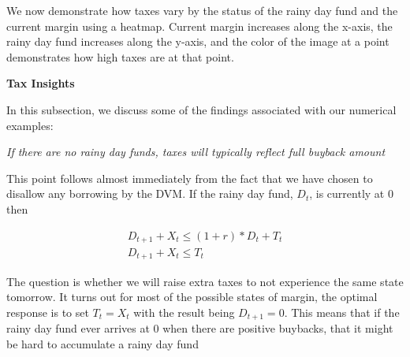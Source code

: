 \begin{center}
  \begin{figure}[H]
    \label{fig:sm_stochastic_buybacks}
  \end{figure}
\end{center}

We now demonstrate how taxes vary by the status of the rainy day fund and the current margin using
a heatmap. Current margin increases along the x-axis, the rainy day fund increases along the y-axis,
and the color of the image at a point demonstrates how high taxes are at that point.


\textbf{Tax Insights}

In this subsection, we discuss some of the findings associated with our numerical examples:

\textit{If there are no rainy day funds, taxes will typically reflect full buyback amount}

This point follows almost immediately from the fact that we have chosen to disallow any borrowing by
the DVM. If the rainy day fund, $D_t$, is currently at 0 then

\begin{align*}
  D_{t+1} + X_{t} \leq (1 + r)*D_t + T_t \\
  D_{t+1} + X_{t} \leq T_t
\end{align*}

The question is whether we will raise extra taxes to not experience the same state tomorrow. It
turns out for most of the possible states of margin, the optimal response is to set $T_t = X_t$ with
the result being $D_{t+1} = 0$. This means that if the rainy day fund ever arrives at 0 when there
are positive buybacks, that it might be hard to accumulate a rainy day fund

\textit{}
